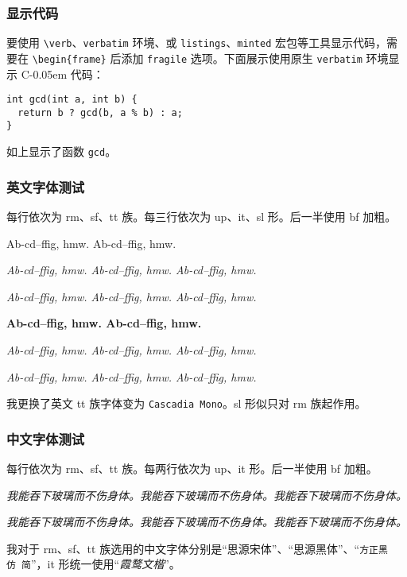 \documentclass{../pkslide}
\newcommand{\Cpp}{\texorpdfstring{C\kern-0.05em\protect\raisebox{.35ex}{\textsmaller[2]{+\kern-0.05em+}}}{C++}}
\begin{document}
\begin{frame}[fragile]
  \frametitle{显示代码}
  
  要使用 \verb|\verb|、\verb|verbatim| 环境、或 \verb|listings|、\verb|minted| 宏包等工具显示代码，需要在 \verb|\begin{frame}| 后添加 \verb|fragile| 选项。下面展示使用原生 \verb|verbatim| 环境显示 \Cpp{} 代码：
  
\begin{verbatim}
int gcd(int a, int b) {
  return b ? gcd(b, a % b) : a;
}
\end{verbatim}
  
  如上显示了函数 \verb|gcd|。
\end{frame}

\begin{frame}
  \frametitle{英文字体测试}
  
  每行依次为 rm、sf、tt 族。每三行依次为 up、it、sl 形。后一半使用 bf 加粗。
  
  {%
    { {\sffamily Ab-cd--ffig, hmw.} {\ttfamily Ab-cd--ffig, hmw.}}
    
    {\itshape {\rmfamily Ab-cd--ffig, hmw.} {\sffamily Ab-cd--ffig, hmw.} {\ttfamily Ab-cd--ffig, hmw.}}
    
    {\slshape {\rmfamily Ab-cd--ffig, hmw.} {\sffamily Ab-cd--ffig, hmw.} {\ttfamily Ab-cd--ffig, hmw.}}
  }%
  
  {\bfseries%
    { {\sffamily Ab-cd--ffig, hmw.} {\ttfamily Ab-cd--ffig, hmw.}}
    
    {\itshape {\rmfamily Ab-cd--ffig, hmw.} {\sffamily Ab-cd--ffig, hmw.} {\ttfamily Ab-cd--ffig, hmw.}}
    
    {\slshape {\rmfamily Ab-cd--ffig, hmw.} {\sffamily Ab-cd--ffig, hmw.} {\ttfamily Ab-cd--ffig, hmw.}}
  }%
  
  我更换了英文 tt 族字体变为 \texttt{Cascadia Mono}。sl 形似只对 rm 族起作用。
\end{frame}

\begin{frame}
  \frametitle{中文字体测试}
  
  每行依次为 rm、sf、tt 族。每两行依次为 up、it 形。后一半使用 bf 加粗。
  
  {%
    {}
    
    {\itshape {\rmfamily{}我能吞下玻璃而不伤身体。}{\sffamily{}我能吞下玻璃而不伤身体。}{\ttfamily{}我能吞下玻璃而不伤身体。}}
    
    {\bfseries%
      {}
      
      {\itshape {\rmfamily{}我能吞下玻璃而不伤身体。}{\sffamily{}我能吞下玻璃而不伤身体。}{\ttfamily{}我能吞下玻璃而不伤身体。}}
    }%
  }%
  
  我对于 rm、sf、tt 族选用的中文字体分别是“\textrm{思源宋体}”、“\textsf{思源黑体}”、“\texttt{方正黑仿\ 简}”，it 形统一使用“\textit{霞鹜文楷}”。
\end{frame}
\end{document}
